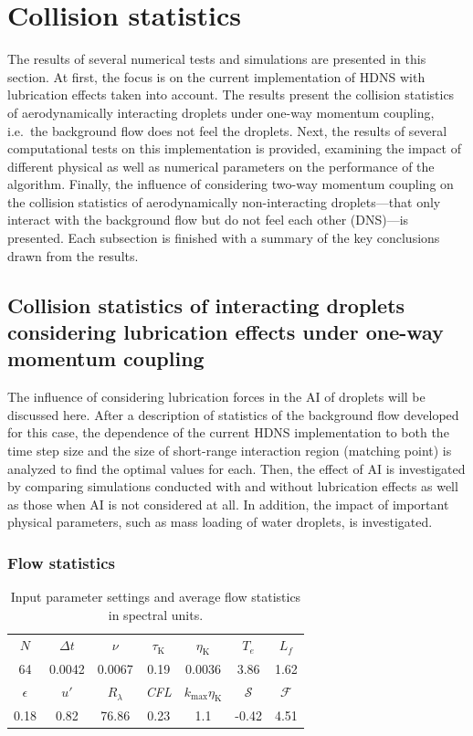 \documentclass[../thesis.tex]{subfiles}
\begin{document}
\section{Collision statistics\label{sec:col}}
The results of several numerical tests and simulations are presented in this section. At first, the focus is on the current implementation of HDNS with lubrication effects taken into account. The results present the collision statistics of aerodynamically interacting droplets under one-way momentum coupling, i.e.\ the background flow does not feel the droplets. Next, the results of several computational tests on this implementation is provided, examining the impact of different physical as well as numerical parameters on the performance of the algorithm. Finally, the influence of considering two-way momentum coupling on the collision statistics of aerodynamically non-interacting droplets---that only interact with the background flow but do not feel each other (DNS)---is presented. Each subsection is finished with a summary of the key conclusions drawn from the results.



\subsection{Collision statistics of interacting droplets considering lubrication effects under one-way momentum coupling\label{sec:lub}}
The influence of considering lubrication forces in the AI of droplets will be discussed here. After a description of statistics of the background flow developed for this case, the dependence of the current HDNS implementation to both the time step size and the size of short-range interaction region (matching point) is analyzed to find the optimal values for each. Then, the effect of AI is investigated by comparing simulations conducted with and without lubrication effects as well as those when AI is not considered at all. In addition, the impact of important physical parameters, such as mass loading of water droplets, is investigated.



\subsubsection{Flow statistics}

\begin{table}[!b]%
\center
  \begin{tabular}{ccccccc}
  \hline\hline
  $N$ & $\Delta t$ & $\nu$ & $\tau_\text{K}$ & $\eta_\text{K}$ & $T_e$ & $L_f$\\
  64 & 0.0042 & 0.0067 & 0.19 & 0.0036 & 3.86 & 1.62\\\hline
  $\epsilon$ & $u'$ & $R_{\lambda}$ & \textit{CFL} & $k_\text{max}\eta_\text{K}$ & $\mathcal{S}$ & $\mathcal{F}$\\
  0.18 & 0.82 & 76.86 & 0.23 & 1.1 & -0.42 & 4.51\\
  \hline\hline
  \end{tabular}
  \caption{Input parameter settings and average flow statistics in spectral units.}
  \label{tab:1}
\end{table}%
\end{document}
